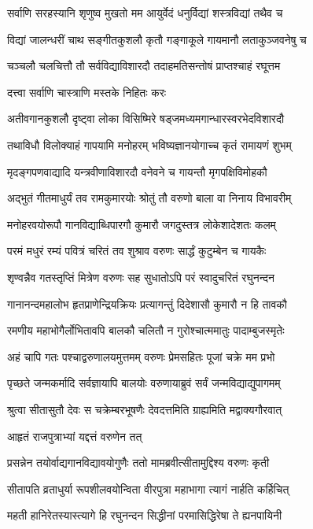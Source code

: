 \twolineshloka
{सर्वाणि सरहस्यानि शृणुष्व मुखतो मम}
{आयुर्वेदं धनुर्विद्यां शस्त्रविद्यां तथैव च}%

\twolineshloka
{विद्यां जालन्धरीं चाथ सङ्गीतकुशलौ कृतौ}
{गङ्गाकूले गायमानौ लताकुञ्जवनेषु च}%

\twolineshloka
{चञ्चलौ चलचित्तौ तौ सर्वविद्याविशारदौ}
{तदाहमतिसन्तोषं प्राप्तश्चाहं रघूत्तम}%

दत्त्वा सर्वाणि चास्त्राणि मस्तके निहितः करः

\twolineshloka
{अतीवगानकुशलौ दृष्ट्वा लोका विसिष्मिरे}
{षड्जमध्यमगान्धारस्वरभेदविशारदौ}%

\twolineshloka
{तथाविधौ विलोक्याहं गापयामि मनोहरम्}
{भविष्यज्ञानयोगाच्च कृतं रामायणं शुभम्}%

\twolineshloka
{मृदङ्गपणवाद्यादि यन्त्रवीणाविशारदौ}
{वनेवने च गायन्तौ मृगपक्षिविमोहकौ}%

\twolineshloka
{अद्भुतं गीतमाधुर्यं तव रामकुमारयोः}
{श्रोतुं तौ वरुणो बाला वा निनाय विभावरीम्}%

\twolineshloka
{मनोहरवयोरूपौ गानविद्याब्धिपारगौ}
{कुमारौ जगदुस्तत्र लोकेशादेशतः कलम्}%

\twolineshloka
{परमं मधुरं रम्यं पवित्रं चरितं तव}
{शुश्राव वरुणः सार्द्धं कुटुम्बेन च गायकैः}%

\twolineshloka
{शृण्वन्नैव गतस्तृप्तिं मित्रेण वरुणः सह}
{सुधातोऽपि परं स्वादुचरितं रघुनन्दन}%

\twolineshloka
{गानानन्दमहालोभ हृतप्राणेन्द्रियक्रियः}
{प्रत्यागन्तुं दिदेशासौ कुमारौ न हि तावकौ}%

\twolineshloka
{रमणीय महाभोगैर्लोभितावपि बालकौ}
{चलितौ न गुरोश्चात्ममातुः पादाम्बुजस्मृतेः}%

\twolineshloka
{अहं चापि गतः पश्चाद्वरुणालयमुत्तमम्}
{वरुणः प्रेमसहितः पूजां चक्रे मम प्रभो}%

\twolineshloka
{पृच्छते जन्मकर्मादि सर्वज्ञायापि बालयोः}
{वरुणायाब्रुवं सर्वं जन्मविद्याद्युपागमम्}%

\twolineshloka
{श्रुत्वा सीतासुतौ देवः स चक्रेम्बरभूषणैः}
{देवदत्तमिति ग्राह्यमिति मद्वाक्यगौरवात्}%

आहृतं राजपुत्राभ्यां यद्दत्तं वरुणेन तत्

\twolineshloka
{प्रसन्नेन तयोर्वाद्यगानविद्यावयोगुणैः}
{ततो मामब्रवीत्सीतामुद्दिश्य वरुणः कृती}%

\twolineshloka
{सीतापति व्रताधुर्या रूपशीलवयोन्विता}
{वीरपुत्रा महाभागा त्यागं नार्हति कर्हिचित्}%

\twolineshloka
{महती हानिरेतस्यास्त्यागे हि रघुनन्दन}
{सिद्धीनां परमासिद्धिरेषा ते ह्यनपायिनी}%

